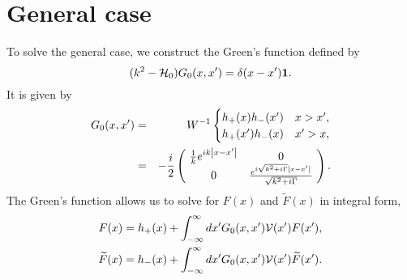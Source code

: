 \section{General case}
To solve the general case, we construct the Green's function defined by
%
\begin{equation}
	(k^2-{\cal H}_{0})G_{0}(x,x')=\delta(x-x')\mathbf{1}.
\end{equation}
%
It is given by
%
\begin{eqnarray}
	G_{0}(x,x')&=&W^{-1} \begin{cases}
	h_{+}(x)h_{-}(x')  & x>x' , \\ h_{+}(x')h_{-}(x) & x'>x ,
	\end{cases} \\
	&=& -\frac{i}{2} \left(\!\begin{array}{cc}
	\frac{1}{k}e^{ i k \abs{x-x'}} & 0\\
	0 & \frac{e^{ i \sqrt{k^2+i \Gamma} \abs{x-x'}}}{\sqrt{k^2+i \Gamma}} \\
	\end{array}\!\right). \nonumber
\end{eqnarray}
%
The Green's function allows us to solve for   $F(x)$ and $\widetilde{F}(x)$ in integral form,
%
\begin{eqnarray}
	F(x)=h_{+}(x)+\int_{-\infty}^{\infty} dx' G_{0}(x,x') {\cal V}(x') F(x'),
	\nonumber\\
	\widetilde{F}(x)=h_{-}(x)+\int_{-\infty}^{\infty} dx' G_{0}(x,x') {\cal V}(x') \widetilde{F}(x').
	\label{eqf}
\end{eqnarray}


